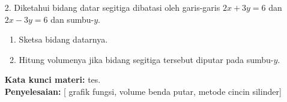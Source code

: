 \documentclass[10pt,openany,a4paper]{article}
\theoremstyle{definition}
\theoremstyle{definition}
\theoremstyle{plain}
\newenvironment{jawab}[2][tes]{
\textbf{Kata kunci materi:} #1.\\
\textbf{Penyelesaian:} #2
}{}
\newenvironment{jawaban}[2][tes]{
\colorlet{oldcolor}{.}
        \color{red}
        \setlength{\fboxrule}{1pt}\boxed{\color{oldcolor}#2}\color{oldcolor}.
}{}
\begin{document}
\begin{enumerate}
\begin{jawab}
{\begin{align*}
&= \colorlet{oldcolor}{.}
        \color{blue}
        \setlength{\fboxrule}{1pt} \boxed{\color{oldcolor}\frac{\cfrac{1}{2}\displaystyle\int_{0}^{2} 1-(x-1)^2 dx}{\displaystyle\int_{0}^{2} \sqrt{1-(x-1)^2} dx}}\color{oldcolor}.
\end{align*}
Kita dapat menghitung integral pada pembilang dan penyebut secara terpisah. Pertama, kita hitung integral pada pembilang:
\allowdisplaybreaks
\begin{align*}
\int_{0}^{2} \left(1-(x-1)^2\right) dx &= \int_{0}^{2} \left(1 - (x^2 - 2x + 1)\right) dx \\
&= \int_{0}^{2} \left(2x - x^2\right) dx \\
&= \left[x^2 - \frac{x^3}{3}\right]_{0}^{2} \\
&= \left(4 - \frac{8}{3}\right) - (0 - 0) \\
&= \colorlet{oldcolor}{.}
        \color{blue}
        \setlength{\fboxrule}{1pt} \boxed{\color{oldcolor}\frac{4}{3}}\color{oldcolor}.
\end{align*}
Selanjutnya, diperhatikan bahwa integral pada penyebut menyatakan luas dari daerah yang dibatasi oleh kurva tersebut, yaitu luas setengah lingkaran dengan jari-jari $1$. Didapatkan bahwa penyebutnya adalah $\frac{1}{2}\pi\cdot 1^2 = \colorlet{oldcolor}{.}
        \color{blue}
        \setlength{\fboxrule}{1pt} \boxed{\color{oldcolor}\frac{\pi}{2}}\color{oldcolor}$. Dengan demikian, 
\begin{align*}
\overline{y} = \frac{\frac{1}{2}\cdot\frac{4}{3}}{\frac{\pi}{2}} = \frac{\frac{2}{3}}{\frac{\pi}{2}}= \frac{4}{3\pi}.
\end{align*}
Jadi, titik berat dari dataran tersebut adalah $\begin{jawaban}
    {\left(1, \frac{4}{3\pi}\right)}
    \end{jawaban}$
                }
            \end{jawab}
            \item[2.] Diketahui bidang datar segitiga dibatasi oleh garis-garis $2x+3y=6$ dan $2x-3y=6$ dan sumbu-$y$.
            \begin{enumerate}
                \item Sketsa bidang datarnya.
                \item Hitung volumenya jika bidang segitiga tersebut diputar pada sumbu-$y$.
            \end{enumerate}
            \begin{jawab}
                [grafik fungsi, volume benda putar, metode cincin silinder]{\\
}
\end{jawab}
\end{enumerate}
\end{document}
